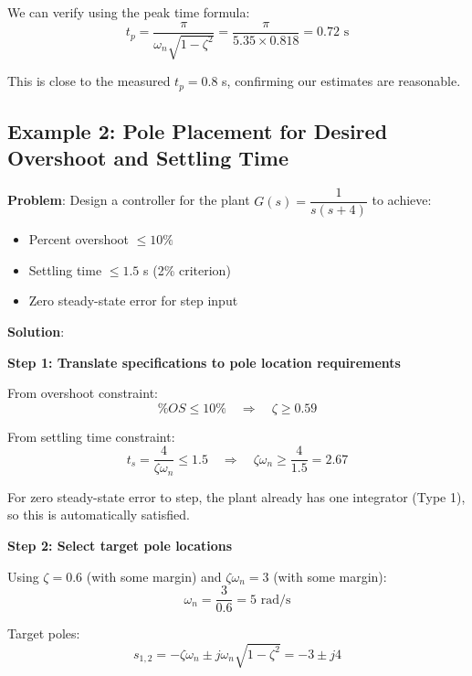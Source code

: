 We can verify using the peak time formula:
\begin{equation}
    t_p = \frac{\pi}{\omega_n\sqrt{1-\zeta^2}} = \frac{\pi}{5.35 \times 0.818} = 0.72 \text{ s}
\end{equation}

This is close to the measured $t_p = 0.8$ s, confirming our estimates are reasonable.

\subsection{Example 2: Pole Placement for Desired Overshoot and Settling Time}

\textbf{Problem}: Design a controller for the plant $G(s) = \dfrac{1}{s(s+4)}$ to achieve:
\begin{itemize}
    \item Percent overshoot $\leq 10\%$
    \item Settling time $\leq 1.5$ s (2\% criterion)
    \item Zero steady-state error for step input
\end{itemize}

\textbf{Solution}:

\textbf{Step 1: Translate specifications to pole location requirements}

From overshoot constraint:
\begin{equation}
    \%OS \leq 10\% \quad \Rightarrow \quad \zeta \geq 0.59
\end{equation}

From settling time constraint:
\begin{equation}
    t_s = \frac{4}{\zeta\omega_n} \leq 1.5 \quad \Rightarrow \quad \zeta\omega_n \geq \frac{4}{1.5} = 2.67
\end{equation}

For zero steady-state error to step, the plant already has one integrator (Type 1), so this is automatically satisfied.

\textbf{Step 2: Select target pole locations}

Using $\zeta = 0.6$ (with some margin) and $\zeta\omega_n = 3$ (with some margin):
\begin{equation}
    \omega_n = \frac{3}{0.6} = 5 \text{ rad/s}
\end{equation}

Target poles:
\begin{equation}
    s_{1,2} = -\zeta\omega_n \pm j\omega_n\sqrt{1-\zeta^2} = -3 \pm j4
\end{equation}

